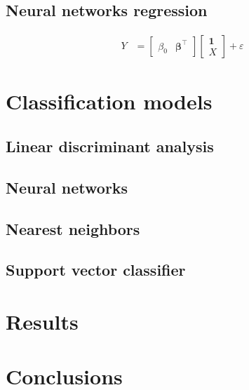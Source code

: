\documentclass[conference]{IEEEtran}
\begin{document}
\subsection{Neural networks regression}

{\color{red}\begin{align} \label{eq:lm}   
  Y &= \begin{bmatrix} 
        \beta_0 & \boldsymbol{\beta}^\top 
       \end{bmatrix} 
       \begin{bmatrix} 
        \mathbf{1} \\ X 
      \end{bmatrix} + \varepsilon
\end{align}} 

\section{Classification models}

\subsection{Linear discriminant analysis}

\subsection{Neural networks}

\subsection{Nearest neighbors}

\subsection{Support vector classifier}

\section{Results} \label{sec:results}

\section{Conclusions}\label{sec:conclusions}
\end{document}
